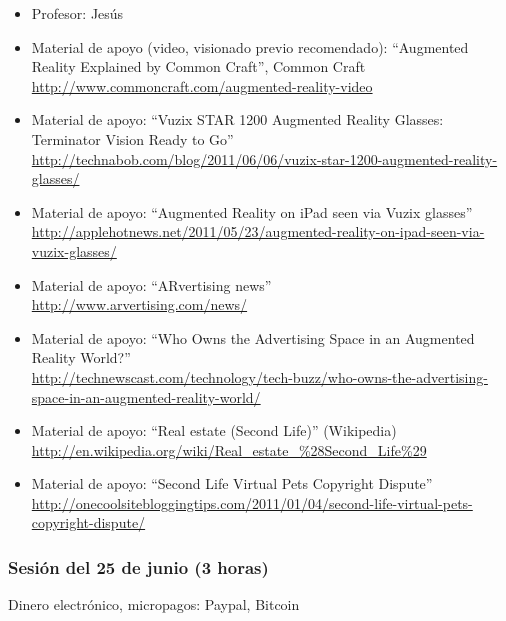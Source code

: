 \documentclass[a4paper,12pt]{article}
\begin{document}
\begin{itemize}
\item Profesor: Jesús
\item Material de apoyo (video, visionado previo recomendado): ``Augmented Reality Explained by Common Craft'', Common Craft \\
  \url{http://www.commoncraft.com/augmented-reality-video}
\item Material de apoyo: ``Vuzix STAR 1200 Augmented Reality Glasses: Terminator Vision Ready to Go'' \\
\url{http://technabob.com/blog/2011/06/06/vuzix-star-1200-augmented-reality-glasses/}
\item Material de apoyo: ``Augmented Reality on iPad seen via Vuzix glasses'' \\
  \url{http://applehotnews.net/2011/05/23/augmented-reality-on-ipad-seen-via-vuzix-glasses/}
\item Material de apoyo: ``ARvertising news'' \\
\url{http://www.arvertising.com/news/}
\item Material de apoyo: ``Who Owns the Advertising Space in an Augmented Reality World?'' \\
\url{http://technewscast.com/technology/tech-buzz/who-owns-the-advertising-space-in-an-augmented-reality-world/}
\item Material de apoyo: ``Real estate (Second Life)'' (Wikipedia) \\
\url{http://en.wikipedia.org/wiki/Real_estate_%28Second_Life%29}
\item Material de apoyo: ``Second Life Virtual Pets Copyright Dispute'' \\
\url{http://onecoolsitebloggingtips.com/2011/01/04/second-life-virtual-pets-copyright-dispute/}
\end{itemize}

\subsubsection{Sesión del 25 de junio (3 horas)}

Dinero electrónico, micropagos: Paypal, Bitcoin
\end{document}
